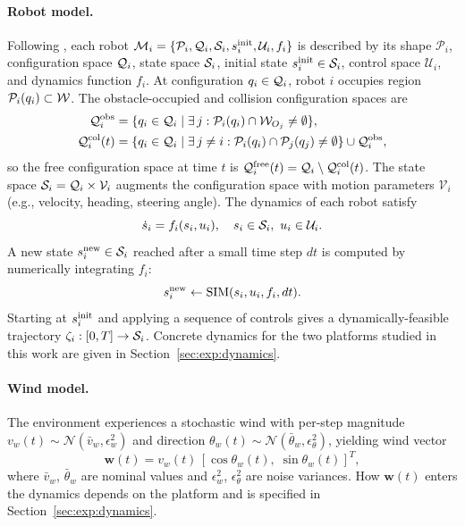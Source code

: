 \documentclass{article}
\providecommand{\free}{\mathrm{free}}
\providecommand{\obs}{\mathrm{obs}}
\providecommand{\col}{\mathrm{col}}
\begin{document}
\paragraph{Robot model.}
Following \citet{plaku2021}, each robot $\mathcal{M}_i = \{ \mathcal{P}_i, \mathcal{Q}_i, \mathcal{S}_i, s_i^{\operatorname{init}}, \mathcal{U}_i, f_i \}$ is described by its shape $\mathcal{P}_i$, configuration space $\mathcal{Q}_i$, state space $\mathcal{S}_i$, initial state $s_i^{\operatorname{init}} \in \mathcal{S}_i$, control space $\mathcal{U}_i$, and dynamics function $f_i$. At configuration $q_i \in \mathcal{Q}_i$, robot $i$ occupies region $\mathcal{P}_i(q_i) \subset \mathcal{W}$. The obstacle-occupied and collision configuration spaces are
\begin{align}
    \config_i^{\obs} &= \{q_i \in \config_i \mid \exists\, j : \mathcal{P}_i(q_i) \cap \wspace_{O_j} \neq \emptyset\}, \label{eq:obs_config} \\
    \config_i^{\col}(t) &= \{q_i \in \config_i \mid \exists\, j \neq i : \mathcal{P}_i(q_i) \cap \mathcal{P}_j(q_j) \neq \emptyset\} \cup \config_i^{\obs}, \label{eq:col_config}
\end{align}
so the free configuration space at time $t$ is $\config_i^{\free}(t) = \config_i \setminus \config_i^{\col}(t)$. The state space $\mathcal{S}_i = \mathcal{Q}_i \times \mathcal{V}_i$ augments the configuration space with motion parameters $\mathcal{V}_i$ (e.g., velocity, heading, steering angle). The dynamics of each robot satisfy
\begin{equation}
    \dot{s}_i = f_i(s_i, u_i), \quad s_i \in \mathcal{S}_i,\ u_i \in \mathcal{U}_i. \label{eq:dynamics}
\end{equation}
A new state $s_i^{\mathrm{new}} \in \mathcal{S}_i$ reached after a small time step $dt$ is computed by numerically integrating $f_i$:
\begin{equation}
    s_i^{\mathrm{new}} \gets \operatorname{SIM}(s_i, u_i, f_i, dt). \label{eq:simulate}
\end{equation}
Starting at $s_i^{\operatorname{init}}$ and applying a sequence of controls gives a dynamically-feasible trajectory $\zeta_i : [0,T] \to \mathcal{S}_i$. Concrete dynamics for the two platforms studied in this work are given in Section~\ref{sec:exp:dynamics}.

\paragraph{Wind model.}
The environment experiences a stochastic wind with per-step magnitude $v_w(t) \sim \mathcal{N}(\bar{v}_w, \epsilon_w^2)$ and direction $\theta_w(t) \sim \mathcal{N}(\bar{\theta}_w, \epsilon_\theta^2)$, yielding wind vector
\begin{equation}
    \mathbf{w}(t) = v_w(t)\,[\cos\theta_w(t),\; \sin\theta_w(t)]^T, \label{eq:wind}
\end{equation}
where $\bar{v}_w$, $\bar{\theta}_w$ are nominal values and $\epsilon_w^2$, $\epsilon_\theta^2$ are noise variances. How $\mathbf{w}(t)$ enters the dynamics depends on the platform and is specified in Section~\ref{sec:exp:dynamics}.
\end{document}
